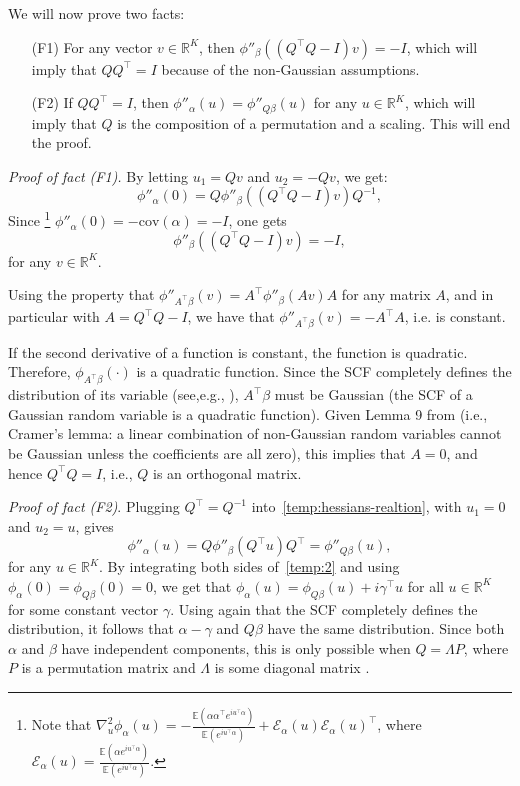 \documentclass{article}
\newcommand{\R}{\mathbb{R}}
\newcommand{\ebb}{\mathbb{E}}
\newcommand{\cov}{\mathrm{cov}}
\newcommand{\ecal}{\mathcal{E}}
\begin{document}
We will now prove two facts:
\begin{enumerate}
\item[(F1)] For any vector $v \in \R^K$, then $\phi''_{\beta} ((Q^{\top} Q -I) v) = - I$, which will imply that $QQ^{\top} = I$ because of the non-Gaussian assumptions.
\item[(F2)] If $QQ^{\top} = I$, then $\phi''_{\alpha}(u) = \phi''_{Q\beta}(u)$ for any $u\in\R^{K}$, which will imply that $Q$ is the composition of a permutation and a scaling. This will end the proof.
\end{enumerate}

\emph{Proof of fact (F1).} By letting $u_1 = Qv$ and $u_2 = - Qv$, we get:
\begin{equation}\label{temp:1}
\phi''_{\alpha} (0) = Q \phi''_{\beta} ( (Q^{\top}Q-I)v) Q^{-1},
\end{equation}
 Since%
\footnote{
Note that $\nabla_u^2\phi_{\alpha}(u) = - \frac{\ebb ({ \alpha \alpha^{\top} e^{iu^{\top}\alpha}})}{\ebb (e^{i u^{\top} \alpha})} + \ecal_{\alpha}(u)\ecal_{\alpha}(u)^{\top}$, where $\ecal_{\alpha}(u)=\frac{\ebb ({ \alpha e^{iu^{\top}\alpha}})}{\ebb (e^{i u^{\top} \alpha})}$.
}
$\phi''_{\alpha}(0)=-\cov(\alpha) = -I$, one gets
$$
\phi''_{\beta} ((Q^{\top}  Q- I)v) = -I,
$$
for any $v\in\R^K$.

Using the property that $\phi''_{A^\top \beta}(v) = A^\top \phi''_\beta(A v) A$ for any matrix $A$, and in particular with $A = Q^{\top} Q - I$, we have that $\phi''_{A^\top \beta}(v) = -A^\top A$, i.e. is constant.


If the second derivative of a function is constant, the function is quadratic. Therefore, $\phi_{A^\top \beta}(\cdot)$ is a quadratic function. Since the SCF completely defines the distribution of its variable (see,e.g., ), $A^\top \beta$ must be Gaussian (the SCF of a Gaussian random variable is a quadratic function). Given Lemma 9 from \citet{Com1994} (i.e., Cramer's lemma: a linear combination of non-Gaussian random variables cannot be Gaussian unless the coefficients are all zero), this implies that $A=0$, and hence $Q^{\top} Q = I$, i.e., $Q$ is an orthogonal matrix.


\emph{Proof of fact (F2)}. Plugging $Q^{\top}=Q^{-1}$ into~\eqref{temp:hessians-realtion}, with $u_1=0$ and $u_2=u$, gives
\begin{equation}\label{temp:2}
\phi''_{\alpha}(u) = Q \phi''_{\beta}(Q^{\top} u) Q^{\top} = \phi''_{Q\beta}(u),
\end{equation}
for any $u\in\R^{K}$.
By integrating both sides of~\eqref{temp:2} and using $\phi_\alpha(0) = \phi_{Q\beta}(0) = 0$, we get that $\phi_\alpha(u) = \phi_{Q\beta}(u) + i \gamma^\top u$ for all $u\in\R^{K}$ for some constant vector $\gamma$. 
Using again that the SCF completely defines the distribution, it follows that $\alpha-\gamma$ and $Q\beta$ have the same distribution. Since both $\alpha$ and $\beta$ have independent components, this is only possible when $Q=\Lambda P$, where $P$ is a permutation matrix and $\Lambda$  is some diagonal matrix \citep[Theorem 11]{Com1994}.
\end{document}
